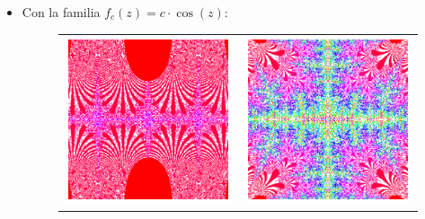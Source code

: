 \begin{itemize}
\item Con la familia $f_c(z)=c\cdot \cos(z)$:
  
\begin{figure}[ht]
  \centering
  \begin{tabular}{cc}
    \includegraphics[scale=0.45]{./img/C3/juliaC-1.png} &   \includegraphics[scale=0.45]{./img/C3/juliaC-2.png}
  \end{tabular}
\end{figure}


\end{itemize}
